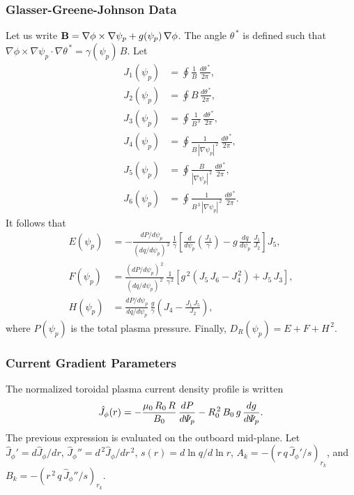 \documentclass[12pt,prb,aps]{revtex4-1}
\begin{document}
\subsubsection{Glasser-Greene-Johnson Data}\label{ggjs}
Let us write
${\bf B} = \nabla\phi\times\nabla\psi_p+g(\psi_p)\,\nabla\phi$. 
The angle $\theta^{\,\ast}$ is defined such that
$\nabla\phi\times\nabla\psi_p\cdot\nabla\theta^{\,\ast} = \gamma(\psi_p)\,B$.
Let
\begin{align}
J_1(\psi_p) &= \oint\frac{1}{B}\,\frac{d\theta^{\,\ast}}{2\pi},\\[0.5ex]
J_2(\psi_p) &= \oint B\,\frac{d\theta^{\,\ast}}{2\pi},\\[0.5ex]
J_3(\psi_p) &= \oint\frac{1}{B^{\,3}}\,\frac{d\theta^{\,\ast}}{2\pi},\\[0.5ex]
J_4(\psi_p) &= \oint\frac{1}{B\,|\nabla\psi_p|^{\,2}}\,\frac{d\theta^{\,\ast}}{2\pi},\\[0.5ex]
J_5(\psi_p) &= \oint\frac{B}{|\nabla\psi_p|^{\,2}}\,\frac{d\theta^{\,\ast}}{2\pi},\\[0.5ex]
J_6(\psi_p) &= \oint\frac{1}{B^{\,3}\,|\nabla\psi_p|^{\,2}}\,\frac{d\theta^{\,\ast}}{2\pi}.
\end{align}
It follows that\,\cite{ggj}
\begin{align}
E(\psi_p) &= - \frac{dP/d\psi_p}{(dq/d\psi_p)^{\,2}}\,\frac{1}{\gamma}\left[\frac{d}{d\psi_p}\!\left(\frac{J_1}{\gamma}\right) - g\,\frac{dq}{d\psi_p}\,\frac{J_1}{J_2}\right]J_5,\\[0.5ex]
F(\psi_p) &= \frac{(dP/d\psi_p)^{\,2}}{(dq/d\psi_p)^{\,2}}\,\frac{1}{\gamma^{\,2}}\left[g^{\,2}\left(J_5\,J_6- J_4^{\,2}\right)+ J_5\,J_3\right],
\\[0.5ex]
H(\psi_p)&= \frac{dP/d\psi_p}{dq/d\psi_p}\,\frac{g}{\gamma}\left(J_4 - \frac{J_1\,J_5}{J_2}\right),
\end{align}
where $P(\psi_p)$ is the total plasma pressure. 
Finally,
$D_R(\psi_p)= E + F + H^{\,2}$. 

\subsubsection{Current Gradient Parameters}
The normalized toroidal plasma current density profile is written
\begin{equation}
\hat{J}_\phi(r) = - \frac{\mu_0\,R_0\,R}{B_0}\,\frac{dP}{d{\mit\Psi}_p} - R_0^{\,2}\,B_0\,g\,\frac{dg}{d{\mit\Psi}_p}.
\end{equation}
 The previous expression is evaluated on the outboard mid-plane.
Let $\hat{J}_\phi'=d\hat{J}_\phi/dr$, $\hat{J}_\phi'' = d^{\,2}\hat{J}_\phi/dr^{\,2}$, 
$s(r) = d\ln q/d\ln r$, 
$A_k = -(r\,q\,\hat{J}_\phi'/s)_{r_k}$, and 
$B_k = -(r^{\,2}\,q\,\hat{J}_\phi''/s)_{r_k}$. 
\end{document}
